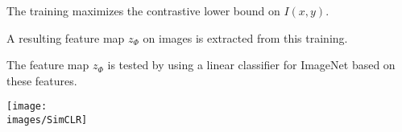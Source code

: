 {\vfill
The training maximizes the contrastive lower bound on $I(x,y)$.


A resulting feature map $z_\Phi$ on images is extracted from this training.

\vfill
The feature map $z_\Phi$ is tested by using a {\color{red} linear} classifier for ImageNet based on these features.


\centerline{\texttt{[image: \\images/SimCLR]}}


}


